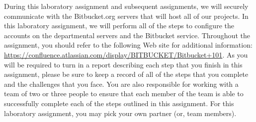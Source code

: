 During this laboratory assignment and subsequent assignments, we will securely communicate with the Bitbucket.org
servers that will host all of our projects.  In this laboratory assignment, we will perform all of the steps to
configure the accounts on the departmental servers and the Bitbucket service.  Throughout the assignment, you should
refer to the following Web site for additional information:
\url{https://confluence.atlassian.com/display/BITBUCKET/Bitbucket+101}.  As you will be required to turn in a report
describing each step that you finish in this assignment, please be sure to keep a record of all of the steps that you
complete and the challenges that you face.  You are also responsible for working with a team of two or three people to
ensure that each member of the team is able to successfully complete each of the steps outlined in this assignment. For
this laboratory assignment, you may pick your own partner (or, team members).

